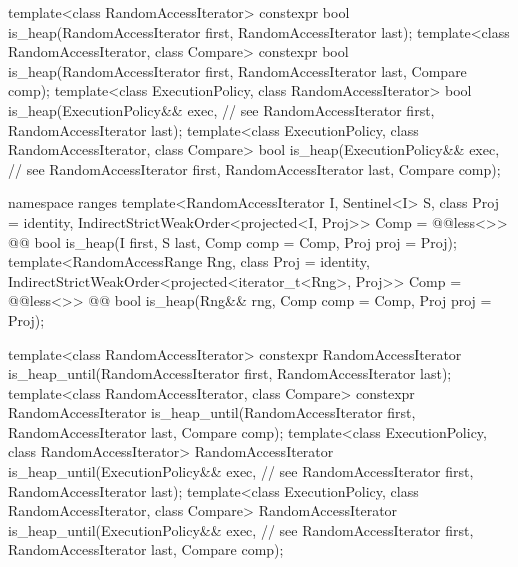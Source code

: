 \begin{codeblock}
  template<class RandomAccessIterator>
    constexpr bool is_heap(RandomAccessIterator first, RandomAccessIterator last);
  template<class RandomAccessIterator, class Compare>
    constexpr bool is_heap(RandomAccessIterator first, RandomAccessIterator last,
                           Compare comp);
  template<class ExecutionPolicy, class RandomAccessIterator>
    bool is_heap(ExecutionPolicy&& exec, // see 
                 RandomAccessIterator first, RandomAccessIterator last);
  template<class ExecutionPolicy, class RandomAccessIterator, class Compare>
    bool is_heap(ExecutionPolicy&& exec, // see 
                 RandomAccessIterator first, RandomAccessIterator last,
                 Compare comp);
\end{codeblock}\begin{addedblock}\begin{codeblock}
  namespace ranges {
    template<RandomAccessIterator I, Sentinel<I> S, class Proj = identity,
        IndirectStrictWeakOrder<projected<I, Proj>> Comp = @@less<>>
      @@ bool is_heap(I first, S last, Comp comp = Comp{}, Proj proj = Proj{});
    template<RandomAccessRange Rng, class Proj = identity,
        IndirectStrictWeakOrder<projected<iterator_t<Rng>, Proj>> Comp = @@less<>>
      @@ bool is_heap(Rng&& rng, Comp comp = Comp{}, Proj proj = Proj{});
  }
\end{codeblock}\end{addedblock}\begin{codeblock}
  template<class RandomAccessIterator>
    constexpr RandomAccessIterator
      is_heap_until(RandomAccessIterator first, RandomAccessIterator last);
  template<class RandomAccessIterator, class Compare>
    constexpr RandomAccessIterator
      is_heap_until(RandomAccessIterator first, RandomAccessIterator last,
                    Compare comp);
  template<class ExecutionPolicy, class RandomAccessIterator>
    RandomAccessIterator
      is_heap_until(ExecutionPolicy&& exec, // see 
                    RandomAccessIterator first, RandomAccessIterator last);
  template<class ExecutionPolicy, class RandomAccessIterator, class Compare>
    RandomAccessIterator
      is_heap_until(ExecutionPolicy&& exec, // see 
                    RandomAccessIterator first, RandomAccessIterator last,
                    Compare comp);
\end{codeblock}\begin{addedblock}\begin{codeblock}

\end{codeblock}
\end{addedblock}
